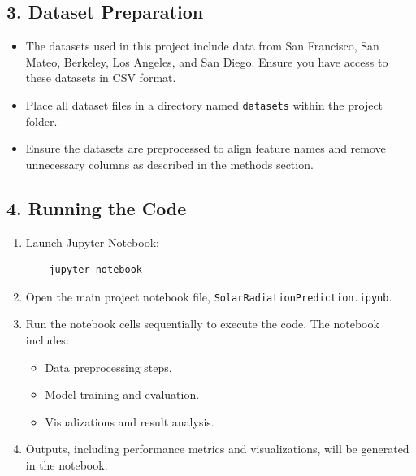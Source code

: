\documentclass[10pt,twocolumn]{article}
\begin{document}
\subsection*{3. Dataset Preparation}
\begin{itemize}
    \item The datasets used in this project include data from San Francisco, San Mateo, Berkeley, Los Angeles, and San Diego. Ensure you have access to these datasets in CSV format.
    \item Place all dataset files in a directory named \texttt{datasets} within the project folder.
    \item Ensure the datasets are preprocessed to align feature names and remove unnecessary columns as described in the methods section.
\end{itemize}

\subsection*{4. Running the Code}
\begin{enumerate}
    \item Launch Jupyter Notebook:
    \begin{verbatim}
    jupyter notebook
    \end{verbatim}
    \item Open the main project notebook file, \texttt{SolarRadiationPrediction.ipynb}.
    \item Run the notebook cells sequentially to execute the code. The notebook includes:
    \begin{itemize}
        \item Data preprocessing steps.
        \item Model training and evaluation.
        \item Visualizations and result analysis.
    \end{itemize}
    \item Outputs, including performance metrics and visualizations, will be generated in the notebook.
\end{enumerate}
\end{document}
